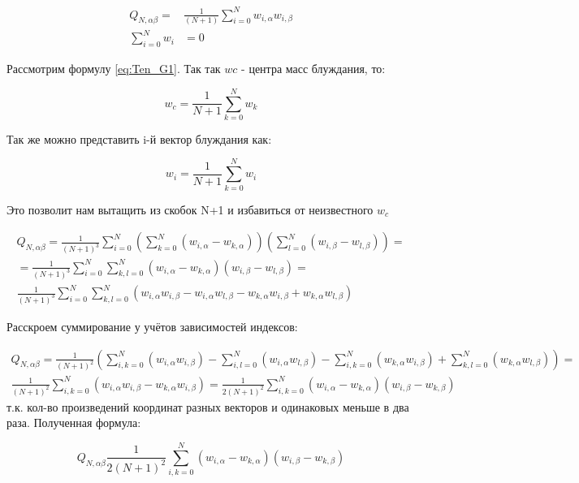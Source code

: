 \begin{align}\label{eq:Ten_G_C}
    Q_{N,\alpha\beta} = &\frac{1}{(N+1)} \sum_{i=0}^{N} w_{i, \alpha} w_{i, \beta} \\
    \sum^{N}_{i=0}w_{i} &= 0
\end{align}

Рассмотрим формулу \eqref{eq:Ten_G1}. Так так $w{c}$ - центра масс блуждания, то:

\begin{equation}
    w_{c} = \frac{1}{N+1} \sum_{k=0}^{N} w_{k}
\end{equation}

Так же можно представить i-й вектор блуждания как:

\begin{equation}
    w_{i} = \frac{1}{N+1} \sum_{k=0}^{N} w_{i}
\end{equation}

Это позволит нам вытащить из скобок N+1 и избавиться от неизвестного $w_{c}$

\begin{align*}
    Q_{N,\alpha\beta} = \frac{1}{(N+1)^{3}} \sum^{N}_{i=0}(\sum^{N}_{k=0}(w_{i,\alpha} - w_{k, \alpha}))(\sum^{N}_{l=0}(w_{i,\beta} - w_{l, \beta})) = \\
    = \frac{1}{(N+1)^{3}} \sum^{N}_{i=0} \sum^{N}_{k,l=0}(w_{i,\alpha} - w_{k, \alpha})(w_{i,\beta} - w_{l, \beta}) = \\
    \frac{1}{(N+1)^{3}} \sum^{N}_{i=0} \sum^{N}_{k,l=0} (w_{i,\alpha} w_{i,\beta} - w_{i,\alpha} w_{l,\beta} - w_{k,\alpha} w_{i,\beta} + w_{k,\alpha} w_{l,\beta})
\end{align*}

Расскроем суммирование у учётов зависимостей индексов:

\begin{align*}
    Q_{N,\alpha\beta} = \frac{1}{(N+1)^{2}} (\sum^{N}_{i,k=0}(w_{i,\alpha} w_{i,\beta}) - \sum^{N}_{i,l=0}(w_{i,\alpha} w_{l,\beta}) - \sum^{N}_{i,k=0}(w_{k,\alpha} w_{i,\beta}) + \sum^{N}_{k,l=0}(w_{k,\alpha} w_{l,\beta})) = \\
    \frac{1}{(N+1)^{2}} \sum^{N}_{i,k=0}(w_{i,\alpha} w_{i,\beta} - w_{k,\alpha} w_{i,\beta}) = \frac{1}{2(N+1)^{2}} \sum^{N}_{i,k=0}(w_{i,\alpha} - w_{k, \alpha})(w_{i,\beta} - w_{k, \beta})
\end{align*}
т.к. кол-во произведений координат разных векторов и одинаковых меньше в два раза. Полученная формула:

\begin{equation}\label{eq:Ten_G2}
    Q_{N,\alpha\beta} \frac{1}{2(N+1)^{2}} \sum^{N}_{i,k=0}(w_{i,\alpha} - w_{k, \alpha})(w_{i,\beta} - w_{k, \beta})
\end{equation}

